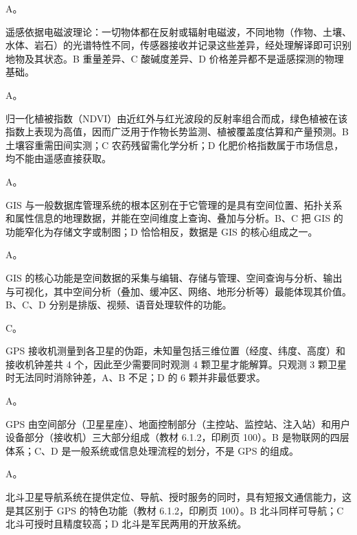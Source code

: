 \documentclass[a4paper,11pt]{article}
\begin{document}


\q A。\begin{analysis}遥感依据电磁波理论：一切物体都在反射或辐射电磁波，不同地物（作物、土壤、水体、岩石）的光谱特性不同，传感器接收并记录这些差异，经处理解译即可识别地物及其状态。B 重量差异、C 酸碱度差异、D 价格差异都不是遥感探测的物理基础。\end{analysis}

\q A。\begin{analysis}归一化植被指数（NDVI）由近红外与红光波段的反射率组合而成，绿色植被在该指数上表现为高值，因而广泛用于作物长势监测、植被覆盖度估算和产量预测。B 土壤容重需田间实测；C 农药残留需化学分析；D 化肥价格指数属于市场信息，均不能由遥感直接获取。\end{analysis}

\q A。\begin{analysis}GIS 与一般数据库管理系统的根本区别在于它管理的是具有空间位置、拓扑关系和属性信息的地理数据，并能在空间维度上查询、叠加与分析。B、C 把 GIS 的功能窄化为存储文字或制图；D 恰恰相反，数据是 GIS 的核心组成之一。\end{analysis}

\q A。\begin{analysis}GIS 的核心功能是空间数据的采集与编辑、存储与管理、空间查询与分析、输出与可视化，其中空间分析（叠加、缓冲区、网络、地形分析等）最能体现其价值。B、C、D 分别是排版、视频、语音处理软件的功能。\end{analysis}

\q C。\begin{analysis}GPS 接收机测量到各卫星的伪距，未知量包括三维位置（经度、纬度、高度）和接收机钟差共 4 个，因此至少需要同时观测 4 颗卫星才能解算。只观测 3 颗卫星时无法同时消除钟差，A、B 不足；D 的 6 颗并非最低要求。\end{analysis}

\q A。\begin{analysis}GPS 由空间部分（卫星星座）、地面控制部分（主控站、监控站、注入站）和用户设备部分（接收机）三大部分组成（教材 6.1.2，印刷页 100）。B 是物联网的四层体系；C、D 是一般系统或信息处理流程的划分，不是 GPS 的组成。\end{analysis}

\q A。\begin{analysis}北斗卫星导航系统在提供定位、导航、授时服务的同时，具有短报文通信能力，这是其区别于 GPS 的特色功能（教材 6.1.2，印刷页 100）。B 北斗同样可导航；C 北斗可授时且精度较高；D 北斗是军民两用的开放系统。\end{analysis}
\end{document}
